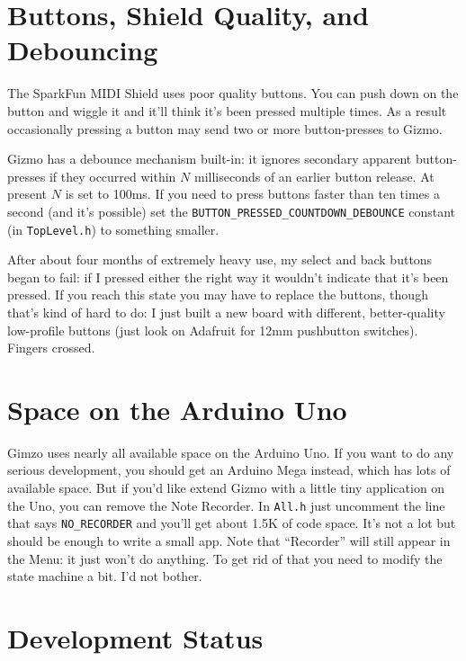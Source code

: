 \documentclass{article}
\begin{document}
\section{Buttons, Shield Quality, and Debouncing}
\label{debouncing}

The SparkFun MIDI Shield uses poor quality buttons.  You can push down on the button and wiggle it and it'll think it's been pressed multiple times.  As a result occasionally pressing a button may send two or more button-presses to Gizmo.

Gizmo has a debounce mechanism built-in: it ignores secondary apparent button-presses if they occurred within \(N\) milliseconds of an earlier button release.  At present \(N\) is set to 100ms.  If you need to press buttons faster than ten times a second (and it's possible) set the \texttt{BUTTON\_PRESSED\_COUNTDOWN\_DEBOUNCE} constant (in \texttt{TopLevel.h}) to something smaller.

After about four months of extremely heavy use, my select and back buttons began to fail: if I pressed either the right way it wouldn't indicate that it's been pressed.  If you reach this state you may have to replace the buttons, though that's kind of hard to do: I just built a new board with different, better-quality low-profile buttons (just look on Adafruit for 12mm pushbutton switches).  Fingers crossed.

\section{Space on the Arduino Uno}
Gimzo uses nearly all available space on the Arduino Uno.  If you want to do any serious development, you should get an Arduino Mega instead, which has lots of available space.  But if you'd like extend Gizmo with a little tiny application on the Uno, you can remove the Note Recorder.  In \texttt{All.h} just uncomment the line that says \texttt{NO\_RECORDER} and you'll get about 1.5K of code space.  It's not a lot but should be enough to write a small app. Note that ``Recorder'' will still appear in the Menu: it just won't do anything.  To get rid of that you need to modify the state machine a bit.  I'd not bother.

\section{Development Status}
\end{document}
